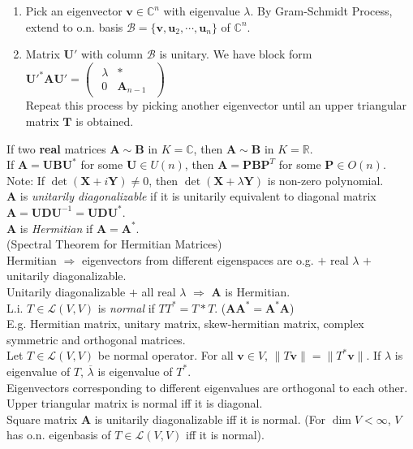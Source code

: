 \documentclass{article}
\theoremstyle{definition}
\begin{document}
\begin{enumerate}
    \item Pick an eigenvector $\mathbf{v}\in\mathbb{C}^{n}$ with eigenvalue $\lambda$. By Gram-Schmidt Process, extend to o.n. basis $\mathcal{B}=\{\mathbf{v},\mathbf{u}_{2},\cdots,\mathbf{u}_{n}\}$ of $\mathbb{C}^{n}$.
    \item Matrix $\mathbf{U}'$ with column $\mathcal{B}$ is unitary. We have block form $\mathbf{U}'^{*}\mathbf{AU}'=\begin{pmatrix}
        \begin{array}{c|c}
            \lambda & *\\
            \hline
            0 & \mathbf{A}_{n-1}
        \end{array}
    \end{pmatrix}$\\
    Repeat this process by picking another eigenvector until an upper triangular matrix $\mathbf{T}$ is obtained.
\end{enumerate}
If two \textbf{real} matrices $\mathbf{A}\sim\mathbf{B}$ in $K=\mathbb{C}$, then $\mathbf{A}\sim\mathbf{B}$ in $K=\mathbb{R}$.\\
If $\mathbf{A}=\mathbf{UBU}^{*}$ for some $\mathbf{U}\in U(n)$, then $\mathbf{A}=\mathbf{PBP}^{T}$ for some $\mathbf{P}\in O(n)$.\\
Note: If $\det(\mathbf{X}+i\mathbf{Y})\neq 0$, then $\det(\mathbf{X}+\lambda\mathbf{Y})$ is non-zero polynomial.\\
$\mathbf{A}$ is \textit{unitarily diagonalizable} if it is unitarily equivalent to diagonal matrix $\mathbf{A}=\mathbf{UDU}^{-1}=\mathbf{UDU}^{*}$.\\
$\mathbf{A}$ is \textit{Hermitian} if $\mathbf{A}=\mathbf{A}^{*}$.\\
(Spectral Theorem for Hermitian Matrices)\\
Hermitian $\Longrightarrow$ eigenvectors from different eigenspaces are o.g. $+$ real $\lambda$ $+$ unitarily diagonalizable.\\
Unitarily diagonalizable $+$ all real $\lambda$ $\Longrightarrow$ $\mathbf{A}$ is Hermitian.\\
L.i. $T\in\mathscr{L}(V,V)$ is \textit{normal} if $TT^{*}=T{*}T$. ($\mathbf{AA}^{*}=\mathbf{A}^{*}\mathbf{A}$)\\
E.g. Hermitian matrix, unitary matrix, skew-hermitian matrix, complex symmetric and orthogonal matrices.\\
Let $T\in\mathscr{L}(V,V)$ be normal operator. For all $\mathbf{v}\in V$, $\lVert T\mathbf{v}\rVert=\lVert T^{*}\mathbf{v}\rVert$. If $\lambda$ is eigenvalue of $T$, $\overline{\lambda}$ is eigenvalue of $T^{*}$.\\
Eigenvectors corresponding to different eigenvalues are orthogonal to each other.\\
Upper triangular matrix is normal iff it is diagonal.\\
Square matrix $\mathbf{A}$ is unitarily diagonalizable iff it is normal. (For $\dim{V}<\infty$, $V$ has o.n. eigenbasis of $T\in\mathscr{L}(V,V)$ iff it is normal).
\end{document}
